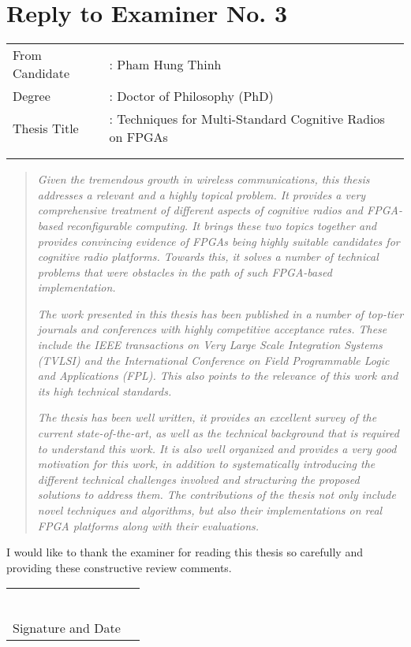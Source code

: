 \documentclass{article}
\begin{document}

\section*{Reply to Examiner No. 3}
\begin{table}[h]
	\begin{tabular}{ll}
		{\large From Candidate} &: {\large Pham Hung Thinh} \\
		{\large Degree }& : {\large Doctor of Philosophy (PhD)}\\
		{\large Thesis Title }&: {\large Techniques for Multi-Standard Cognitive Radios on FPGAs}\\
		& \\
		& 
	\end{tabular}
\end{table}
\begin{quote}
\emph{Given the tremendous growth in wireless communications, this thesis addresses a relevant and a highly topical problem. It provides a very comprehensive treatment of different aspects of cognitive radios and FPGA-based reconfigurable computing. It brings these two topics together and provides convincing evidence of FPGAs being highly suitable candidates for cognitive radio platforms. Towards this, it solves a number of technical problems that were obstacles in the path of such FPGA-based implementation.}
	
\emph{The work presented in this thesis has been published in a number of top-tier journals and conferences with highly competitive acceptance rates. These include the IEEE transactions on Very Large Scale Integration Systems (TVLSI) and the International Conference on Field Programmable Logic and Applications (FPL). This also points to the relevance of this work and its high technical standards.}

\emph{The thesis has been well written, it provides an excellent survey of the current state-of-the-art, as well as the technical background that is required to understand this work. It is also well organized and provides a very good motivation for this work, in addition to systematically introducing the different technical challenges involved and structuring the proposed solutions to address them. The contributions of the thesis not only include novel techniques and algorithms, but also their implementations on real FPGA platforms along with their evaluations.}
\end{quote}

I would like to thank the examiner for reading this thesis so carefully and providing these constructive review comments.

\begin{table}[h]
	\begin{tabular}{ll}
		& \\
		& \\
		& \\
		& \\
		& \\
		& \\
		
		Signature and Date 
	\end{tabular}
\end{table}
\end{document}
